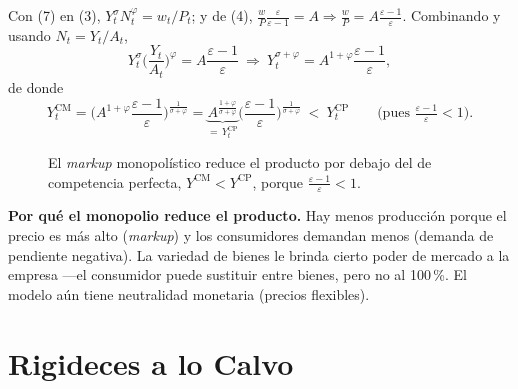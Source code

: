 \documentclass[11pt]{article}
\newenvironment{clave}[1][Idea clave]%
  {\par\medskip\noindent\textbf{#1.}\enspace\ignorespaces}%
  {\par\medskip}
\theoremstyle{definition}
\newcommand{\CP}{\mathrm{CP}}
\newcommand{\CM}{\mathrm{CM}}
\begin{document}
Con (7) en (3), $Y_{t}^{\sigma}N_{t}^{\varphi}=w_{t}/P_{t}$; y de (4),
$\tfrac{w}{P}\tfrac{\varepsilon}{\varepsilon-1}=A\Rightarrow \tfrac{w}{P}=A\tfrac{\varepsilon-1}{\varepsilon}$.
Combinando y usando $N_{t}=Y_{t}/A_{t}$,
\begin{equation}
Y_{t}^{\sigma}\Big(\frac{Y_{t}}{A_{t}}\Big)^{\varphi}=A\frac{\varepsilon-1}{\varepsilon}
\ \Longrightarrow\
Y_{t}^{\sigma+\varphi}=A^{1+\varphi}\frac{\varepsilon-1}{\varepsilon},
\end{equation}
de donde
\begin{equation}
Y_{t}^{\CM}=\Big(A^{1+\varphi}\frac{\varepsilon-1}{\varepsilon}\Big)^{\frac{1}{\sigma+\varphi}}
=\underbrace{A^{\frac{1+\varphi}{\sigma+\varphi}}}_{=\,Y_{t}^{\CP}}
\Big(\frac{\varepsilon-1}{\varepsilon}\Big)^{\frac{1}{\sigma+\varphi}}
\ <\ Y_{t}^{\CP}\qquad\Big(\text{pues }\tfrac{\varepsilon-1}{\varepsilon}<1\Big).
\end{equation}


\begin{figure}[h]
\centering
{}
\caption{El \emph{markup} monopolístico reduce el producto por debajo del de competencia perfecta,
$Y^{\CM}<Y^{\CP}$, porque $\tfrac{\varepsilon-1}{\varepsilon}<1$.}
\end{figure}

\begin{clave}[Por qué el monopolio reduce el producto]
Hay menos producción porque el precio es más alto (\emph{markup}) y los consumidores demandan menos
(demanda de pendiente negativa). La variedad de bienes le brinda cierto poder de mercado a la empresa
---el consumidor puede sustituir entre bienes, pero no al 100\,\%. El modelo aún tiene neutralidad
monetaria (precios flexibles).
\end{clave}

\section{Rigideces a lo Calvo}
\end{document}
